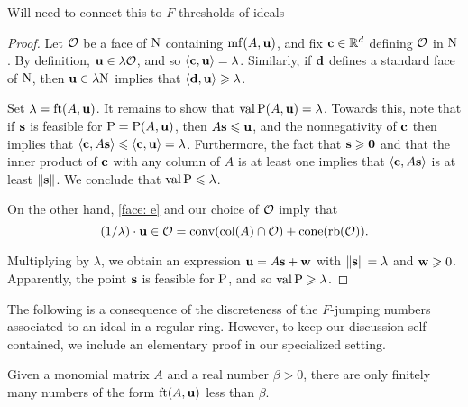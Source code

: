 \documentclass[11pt]{amsart}
\begin{document}
\alert[inline]{Will need to connect this to $F$-thresholds of ideals}

\begin{proof} Let $\mathcal{O}$ be a face of $\mathrm{N}$ containing $\operatorname{mf}(A,\mathbf{u})$, and fix $\mathbf{c} \in \mathbb{R}^d$ defining $\mathcal{O}$ in $\mathrm{N}$.  By definition, $\mathbf{u} \in \lambda \mathcal{O}$, and so $\langle \mathbf{c}, \mathbf{u} \rangle = \lambda$.    Similarly, if $\mathbf{d}$ defines a standard face of $\mathrm{N}$, then $\mathbf{u} \in \lambda \mathrm{N}$ implies that $\langle \mathbf{d}, \mathbf{u} \rangle \geqslant \lambda$.

Set $\lambda = \operatorname{ft}(A, \mathbf{u})$.  It remains to show that $\operatorname{val} \mathrm{P}(A, \mathbf{u}) = \lambda$.  Towards this, note that if $\mathbf{s}$ is feasible for $\mathrm{P} = \mathrm{P}(A, \mathbf{u})$, then $A \mathbf{s} \leqslant \mathbf{u}$, and the nonnegativity of $\mathbf{c}$ then implies that  $\langle \mathbf{c}, A \mathbf{s} \rangle \leqslant \langle \mathbf{c}, \mathbf{u} \rangle = \lambda$.  Furthermore, the fact that $\mathbf{s} \geqslant \mathbf{0}$ and that the inner product of $\mathbf{c}$ with any column of $A$ is at least one implies that $\langle \mathbf{c}, A \mathbf{s} \rangle$ is at least $\| \mathbf{s} \|$.  We conclude that $\operatorname{val} \mathrm{P} \leqslant \lambda$.  

On the other hand, \eqref{face: e} and our choice of $\mathcal{O}$ imply that 
\begin{equation}
\label{cone containment: e}
 (1/\lambda) \cdot \mathbf{u} \in \mathcal{O} = \operatorname{conv}(\operatorname{col}(A) \cap \mathcal{O}) + \operatorname{cone}(\operatorname{rb}(\mathcal{O})).
\end{equation}

Multiplying by $\lambda$, we obtain an expression $\mathbf{u} = A \mathbf{s} + \mathbf{w}$ with $\| \mathbf{s} \| = \lambda$ and $\mathbf{w} \geqslant 0$.  Apparently, the point $\mathbf{s}$ is feasible for $\mathrm{P}$, and so $\operatorname{val} \mathrm{P} \geqslant \lambda$.
\end{proof}


The following is a consequence of the discreteness of the $F$-jumping numbers associated to an ideal in a regular ring.  However, to keep our discussion self-contained, we include an elementary proof in our specialized setting.


\begin{lemma}
\label{discreteness of F-thresholds: L}
Given a monomial matrix $A$ and a real number $\beta > 0 $, there are only finitely many numbers of the form $\operatorname{ft}(A, \mathbf{u})$ less than $\beta$.    
\end{lemma}
\end{document}

